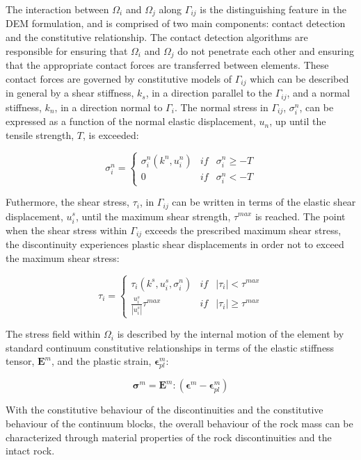 
The interaction between $\Omega_i$ and $\Omega_j$ along $\Gamma_{ij}$ is the distinguishing feature in the DEM formulation, and is comprised of two main components: contact detection and the constitutive relationship. The contact detection algorithms are responsible for ensuring that $\Omega_i$ and $\Omega_j$ do not penetrate each other and ensuring that the appropriate contact forces are transferred between elements. These contact forces are governed by constitutive models of $\Gamma_{ij}$ which can be described in general by a shear stiffness, $k_s$, in a direction parallel to the $\Gamma_{ij}$, and a normal stiffness, $k_n$, in a direction normal to $\Gamma_i$. The normal stress in $\Gamma_{ij}$, $\sigma_i^n$, can be expressed as a function of the normal elastic displacement, $u_n$, up until the tensile strength, $T$, is exceeded: 

\begin{equation}
\sigma^n_i=\left\{\begin{matrix}
\sigma^n_i\left(k^n, u_i^n\right) &if& \sigma^n_i \geq -T\\ 
 0 & if &\sigma^n_i < -T
\end{matrix}\right.
\label{eqn:demnormal}
\end{equation}

Futhermore, the shear stress, $\tau_i$, in $\Gamma_{ij}$ can be written in terms of the elastic shear displacement, $u_i^s$, until the maximum shear strength, $\tau^{max}$ is reached. The point when the shear stress within $\Gamma_{ij}$ exceeds the prescribed maximum shear stress, the discontinuity experiences plastic shear displacements in order not to exceed the maximum shear stress:

\begin{equation}
\tau_i=\left\{\begin{matrix}
\tau_i\left(k^s,u_i^s, \sigma_i^n\right) &if&\left |\tau_i \right | < \tau^{max}\\ 
\frac{u_i^s}{\left|u_i^s\right|}\tau^{max} & if &\left |\tau_i \right | \geq \tau^{max}
\end{matrix}\right.
\label{eqn:demshear}
\end{equation}

The stress field within $\Omega_i$ is described by the internal motion of the element by standard continuum constitutive relationships in terms of the elastic stiffness tensor, $\mathbf{E}^m$, and the plastic strain, $\boldsymbol{\epsilon}^m_{pl}$:  

\begin{equation}
\boldsymbol{\sigma}^m =\mathbf{E}^m:\left(\boldsymbol{\epsilon}^m - \boldsymbol{\epsilon}^m_{pl}\right)
\label{eqn:demcont}
\end{equation}

With the constitutive behaviour of the discontinuities and the constitutive behaviour of the continuum blocks, the overall behaviour of the rock mass can be characterized through material properties of the rock discontinuities and the intact rock.